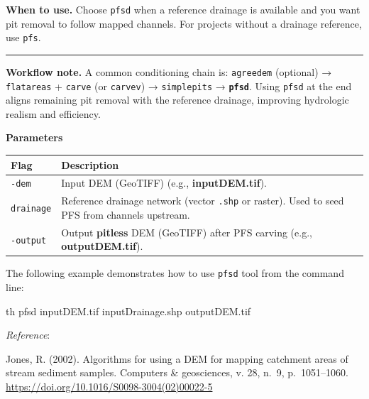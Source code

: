 \documentclass[
]{book}
\newenvironment{Shaded}{\begin{snugshade}}{\end{snugshade}}
\newcommand{\ExtensionTok}[1]{#1}
\newcommand{\NormalTok}[1]{#1}
\theoremstyle{definition}
\theoremstyle{definition}
\theoremstyle{definition}
\theoremstyle{definition}
\theoremstyle{remark}
\begin{document}
\textbf{When to use.} Choose \texttt{pfsd} when a reference drainage is available and you want pit removal to follow mapped channels. For projects without a drainage reference, use \texttt{pfs}.

\begin{center}\rule{0.5\linewidth}{0.5pt}\end{center}

\textbf{Workflow note.} A common conditioning chain is:
\texttt{agreedem} (optional) → \texttt{flatareas} + \texttt{carve} (or \texttt{carvev}) → \texttt{simplepits} → \textbf{\texttt{pfsd}}.
Using \texttt{pfsd} at the end aligns remaining pit removal with the reference drainage, improving hydrologic realism and efficiency.

\textbf{Parameters}

\begin{longtable}[]{@{}
  >{\raggedright\arraybackslash}p{}
  >{\raggedright\arraybackslash}p{}@{}}
\toprule\noalign{}
\begin{minipage}[b]{\linewidth}\raggedright
Flag
\end{minipage} & \begin{minipage}[b]{\linewidth}\raggedright
Description
\end{minipage} \\
\midrule\noalign{}
\endhead
\bottomrule\noalign{}
\endlastfoot
\texttt{-dem} & Input DEM (GeoTIFF) (e.g., \textbf{inputDEM.tif}). \\
\texttt{drainage} & Reference drainage network (vector \texttt{.shp} or raster). Used to seed PFS from channels upstream. \\
\texttt{-output} & Output \textbf{pitless} DEM (GeoTIFF) after PFS carving (e.g., \textbf{outputDEM.tif}). \\
\end{longtable}

The following example demonstrates how to use \texttt{pfsd} tool from the command line:

\begin{Shaded}
\begin{Highlighting}[]
\ExtensionTok{th}\NormalTok{ pfsd inputDEM.tif inputDrainage.shp outputDEM.tif}
\end{Highlighting}
\end{Shaded}

\emph{Reference}:

Jones, R. (2002). Algorithms for using a DEM for mapping catchment areas of stream sediment samples. Computers \& geosciences, v. 28, n.~9, p.~1051--1060. \url{https://doi.org/10.1016/S0098-3004(02)00022-5}
\end{document}

